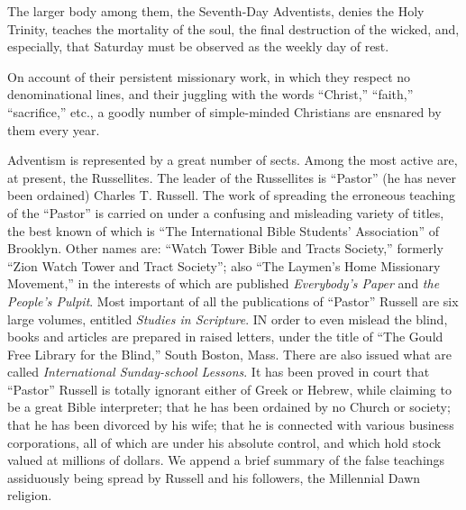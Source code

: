 \documentclass[
]{book}
\begin{document}
The larger body among them, the Seventh-Day Adventists, denies the Holy Trinity, teaches the mortality of the soul, the final destruction of the wicked, and, especially, that Saturday must be observed as the weekly day of rest.

On account of their persistent missionary work, in which they respect no denominational lines, and their juggling with the words ``Christ,'' ``faith,'' ``sacrifice,'' etc., a goodly number of simple-minded Christians are ensnared by them every year.

Adventism is represented by a great number of sects. Among the most active are, at present, the Russellites. The leader of the Russellites is ``Pastor'' (he has never been ordained) Charles T. Russell. The work of spreading the erroneous teaching of the ``Pastor'' is carried on under a confusing and misleading variety of titles, the best known of which is ``The International Bible Students' Association'' of Brooklyn. Other names are: ``Watch Tower Bible and Tracts Society,'' formerly ``Zion Watch Tower and Tract Society''; also ``The Laymen's Home Missionary Movement,'' in the interests of which are published \emph{Everybody's Paper} and \emph{the People's Pulpit}. Most important of all the publications of ``Pastor'' Russell are six large volumes, entitled \emph{Studies in Scripture}. IN order to even mislead the blind, books and articles are prepared in raised letters, under the title of ``The Gould Free Library for the Blind,'' South Boston, Mass. There are also issued what are called \emph{International Sunday-school Lessons}. It has been proved in court that ``Pastor'' Russell is totally ignorant either of Greek or Hebrew, while claiming to be a great Bible interpreter; that he has been ordained by no Church or society; that he has been divorced by his wife; that he is connected with various business corporations, all of which are under his absolute control, and which hold stock valued at millions of dollars. We append a brief summary of the false teachings assiduously being spread by Russell and his followers, the Millennial Dawn religion.
\end{document}
